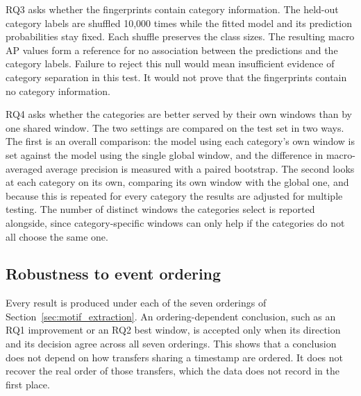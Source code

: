 RQ3 asks whether the fingerprints contain category information. The held-out
category labels are shuffled 10{,}000 times while the fitted model and its
prediction probabilities stay fixed. Each shuffle preserves the class sizes.
The resulting macro AP values form a reference for no association between the
predictions and the category labels. Failure to reject this null would mean
insufficient evidence of category separation in this test. It would not prove
that the fingerprints contain no category information.

RQ4 asks whether the categories are better served by their own windows than by one
shared window. The two settings are compared on the test set in two ways. The first
is an overall comparison: the model using each category's own window is set against
the model using the single global window, and the difference in macro-averaged
average precision is measured with a paired bootstrap. The second looks at each
category on its own, comparing its own window with the global one, and because this
is repeated for every category the results are adjusted for multiple testing. The
number of distinct windows the categories select is reported alongside, since
category-specific windows can only help if the categories do not all choose the
same one.

\subsection{Robustness to event ordering}

Every result is produced under each of the seven orderings of
Section~\ref{sec:motif_extraction}. An ordering-dependent conclusion, such as an
RQ1 improvement or an RQ2 best window, is accepted only when its direction and its
decision agree across all seven orderings. This shows that a conclusion does not
depend on how transfers sharing a timestamp are ordered. It does not recover the
real order of those transfers, which the data does not record in the first place.
